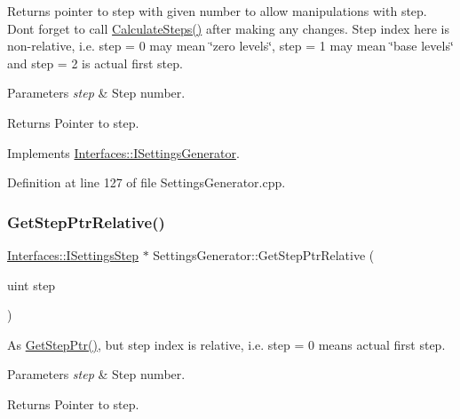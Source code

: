 Returns pointer to step with given number to allow manipulations with step. Don\textquotesingle{}t forget to call \hyperlink{class_settings_generator_a7c9c1a7a3928ba3ce0ad110593b97a96}{Calculate\+Steps()} after making any changes. Step index here is non-\/relative, i.\+e. step = 0 may mean \char`\"{}zero levels\char`\"{}, step = 1 may mean \char`\"{}base levels\char`\"{} and step = 2 is actual first step. 


\begin{DoxyParams}{Parameters}
{\em step} & Step number. \\
\hline
\end{DoxyParams}
\begin{DoxyReturn}{Returns}
Pointer to step. 
\end{DoxyReturn}


Implements \hyperlink{class_interfaces_1_1_i_settings_generator_af1b65a18c3ade3235715ae2e9cdbcfe0}{Interfaces\+::\+I\+Settings\+Generator}.



Definition at line 127 of file Settings\+Generator.\+cpp.

\mbox{\label{class_settings_generator_aa45d5a3c1349c18ac611ad960ff8470d}} 
\subsubsection{\texorpdfstring{Get\+Step\+Ptr\+Relative()}{GetStepPtrRelative()}}
{\footnotesize\ttfamily \hyperlink{class_interfaces_1_1_i_settings_step}{Interfaces\+::\+I\+Settings\+Step} $\ast$ Settings\+Generator\+::\+Get\+Step\+Ptr\+Relative (\begin{DoxyParamCaption}\item[{uint}]{step }\end{DoxyParamCaption})\hspace{0.3cm}{\ttfamily [virtual]}}



As \hyperlink{class_settings_generator_a37f4175a0ed24853b2f187f15505086b}{Get\+Step\+Ptr()}, but step index is relative, i.\+e. step = 0 means actual first step. 


\begin{DoxyParams}{Parameters}
{\em step} & Step number. \\
\hline
\end{DoxyParams}
\begin{DoxyReturn}{Returns}
Pointer to step. 
\end{DoxyReturn}


